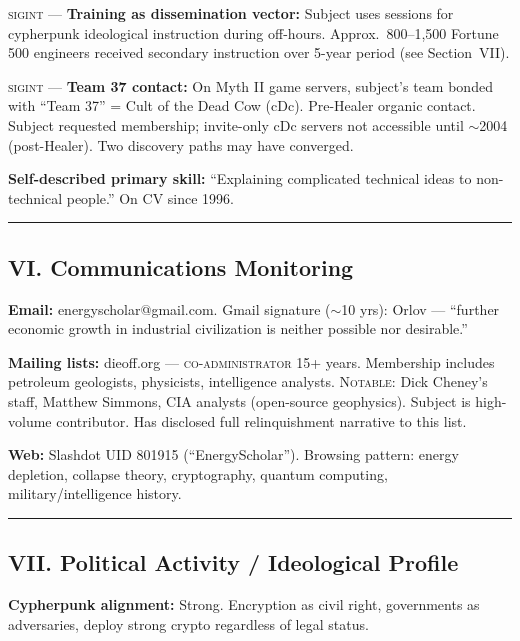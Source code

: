 \textsc{sigint} --- \textbf{Training as dissemination vector:} Subject uses sessions for cypherpunk ideological instruction during off-hours. Approx.\ 800--1,500 Fortune 500 engineers received secondary instruction over 5-year period (see Section~VII).

\textsc{sigint} --- \textbf{Team 37 contact:} On Myth II game servers, subject's team bonded with ``Team 37'' = Cult of the Dead Cow (cDc). Pre-Healer organic contact. Subject requested membership; invite-only cDc servers not accessible until $\sim$2004 (post-Healer). Two discovery paths may have converged.

\textbf{Self-described primary skill:} ``Explaining complicated technical ideas to non-technical people.'' On CV since 1996.

\vspace{1cm}\hrule\vspace{1cm}

\subsection*{VI. Communications Monitoring}
\label{interlude:communications-monitoring}

\textbf{Email:} energyscholar@gmail.com. Gmail signature ($\sim$10 yrs): Orlov --- ``further economic growth in industrial civilization is neither possible nor desirable.''

\textbf{Mailing lists:} dieoff.org --- \textsc{co-administrator} 15+ years. Membership includes petroleum geologists, physicists, intelligence analysts. \textsc{Notable}: Dick Cheney's staff, Matthew Simmons, CIA analysts (open-source geophysics). Subject is high-volume contributor. Has disclosed full relinquishment narrative to this list.

\textbf{Web:} Slashdot UID 801915 (``EnergyScholar''). Browsing pattern: energy depletion, collapse theory, cryptography, quantum computing, military/intelligence history.

\vspace{1cm}\hrule\vspace{1cm}

\subsection*{VII. Political Activity / Ideological Profile}
\label{interlude:political-activity-ideological-profile}

\textbf{Cypherpunk alignment:} Strong. Encryption as civil right, governments as adversaries, deploy strong crypto regardless of legal status.

